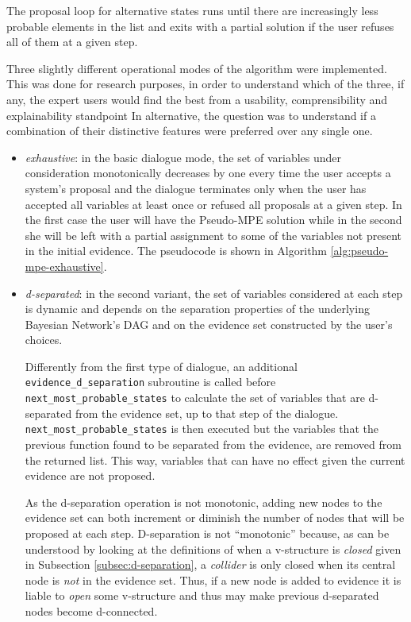 The proposal loop for alternative states runs until there are increasingly less probable elements in the list and exits with a partial solution if the user refuses all of them at a given step.

Three slightly different operational modes of the algorithm were implemented.
This was done for research purposes, in order to understand which of the three, if any, the expert users would find the best from a usability, comprensibility and explainability standpoint
In alternative, the question was to understand if a combination of their distinctive features were preferred over any single one.
\begin{itemize}
  \item \textit{exhaustive}: in the basic dialogue mode, the set of variables under consideration monotonically decreases by one every time the user accepts a system's proposal and the dialogue terminates only when the user has accepted all variables at least once or refused all proposals at a given step.
	In the first case the user will have the Pseudo-MPE solution while in the second she will be left with a partial assignment to some of the variables not present in the initial evidence.
	The pseudocode is shown in Algorithm \ref{alg:pseudo-mpe-exhaustive}.
  \item \textit{d-separated}: in the second variant, the set of variables considered at each step is dynamic and depends on the separation properties of the underlying Bayesian Network's DAG and on the evidence set constructed by the user's choices.
  
  	Differently from the first type of dialogue, an additional \texttt{evidence\_d\_separation} subroutine is called before \texttt{next\_most\_probable\_states} to calculate the set of variables that are d-separated from the evidence set, up to that step of the dialogue.
  	\texttt{next\_most\_probable\_states} is then executed but the variables that the previous function found to be separated from the evidence, are removed from the returned list.
  	This way, variables that can have no effect given the current evidence are not proposed.
  	
  	As the d-separation operation is not monotonic, adding new nodes to the evidence set can both increment or diminish the number of nodes that will be proposed at each step.
  	D-separation is not \enquote{monotonic} because, as can be understood by looking at the definitions of when a v-structure is \textit{closed} given in Subsection \ref{subsec:d-separation}, a \textit{collider} is only closed when its central node is \textit{not} in the evidence set.
  	Thus, if a new node is added to evidence it is liable to \textit{open} some v-structure and thus may make previous d-separated nodes become d-connected.
  	

\end{itemize}

